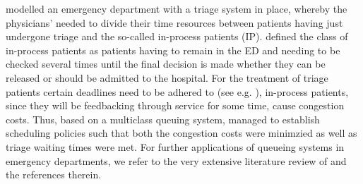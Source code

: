 \documentclass[11pt,a4paper]{article}
\begin{document}
\begin{spacing}{1.8}
\citet{Huang2015} modelled  an emergency department with a triage system in place, whereby the physicians'  needed to divide their time resources between patients having just undergone triage and the so-called in-process patients (IP). \citep{Huang2015} defined the class of in-process patients as patients having to remain in the ED and needing to be checked several times until the final decision is made whether they can be released or should be admitted to the hospital. For the treatment of triage patients certain deadlines need to be adhered to (see e.g. \citep{Pardey2006}), in-process patients, since they will be feedbacking through service for some time, cause congestion costs. 
Thus, based on a multiclass queuing system, \citet{Huang2015} managed to establish scheduling policies such that both the congestion costs were minimzied as well as triage waiting times were met.
For further applications of queueing systems in emergency departments, we refer to the very extensive literature review of  \citep{Elalouf2021} and the references therein.


\end{spacing}
\end{document}
